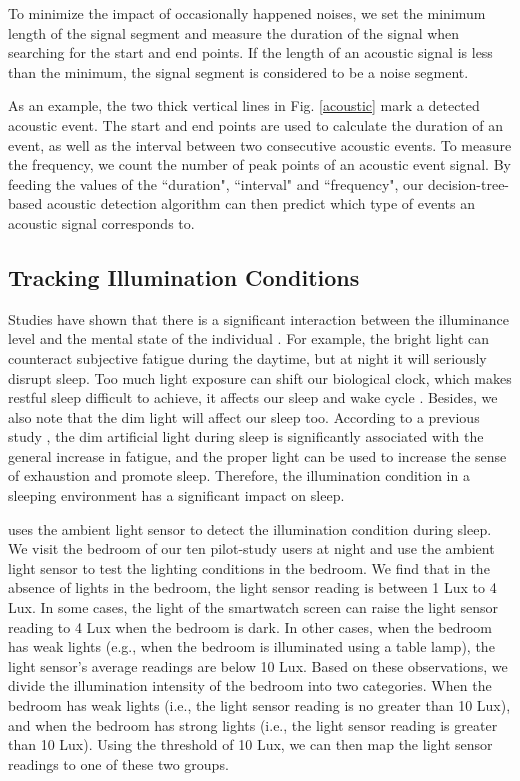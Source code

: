 To minimize the impact of occasionally happened noises, we set the minimum length of the signal segment and measure the duration of the
signal when searching for the start and end points. If the length of an acoustic signal is less than the minimum, the signal segment is
considered to be a noise segment.

 As an example, the two thick vertical lines in Fig. \ref{acoustic} mark a detected acoustic event. The start and end
points are used to calculate the duration of an event, as well as the interval between two consecutive acoustic events. To measure the
frequency, we count the number of peak points of an acoustic event signal. By feeding the values of the ``duration", ``interval" and
``frequency", our decision-tree-based acoustic detection algorithm can then predict which type of events an acoustic signal corresponds to.



\subsection{Tracking Illumination Conditions \label{sec:illumination}}
Studies have shown that there is a significant interaction between the illuminance level and the mental state of the individual
\cite{light77}. For example, the bright light can counteract subjective fatigue during the daytime, but at night it will seriously disrupt
sleep. Too much light exposure can shift our biological clock, which makes restful sleep difficult to achieve, it affects our sleep and
wake cycle \cite{light2007}.  Besides, we also note that the dim light will affect our sleep too. According to a previous study
\cite{light2016}, the dim artificial light during sleep is significantly associated with the general increase in fatigue, and the proper
light can be used to increase the sense of exhaustion and promote sleep. Therefore, the illumination condition in a sleeping environment
has a significant impact on sleep.

{\systemname} uses the ambient light sensor to detect the illumination condition during sleep. We visit the bedroom of our ten pilot-study
users at night and use the ambient light sensor to test the lighting conditions in the bedroom. We find that in the absence of lights in
the bedroom, the light sensor reading is between 1 Lux to 4 Lux. In some cases, the light of the smartwatch screen can raise the light
sensor reading to 4 Lux when the bedroom is dark. In other cases, when the bedroom has weak lights (e.g., when the bedroom is illuminated
using a table lamp), the light sensor's average readings are below 10 Lux. Based on these observations, we divide the illumination
intensity of the bedroom into two categories. When the bedroom has weak lights (i.e., the light sensor reading is no greater than 10 Lux),
and when the bedroom has strong lights (i.e., the light sensor reading is greater than 10 Lux). Using the threshold of 10 Lux, we can then
map the light sensor readings to one of these two groups.


